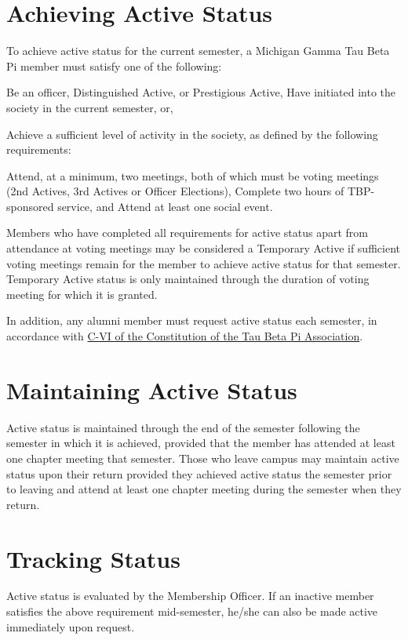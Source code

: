 \section{Achieving Active Status} To achieve active status for the current semester, a Michigan Gamma Tau Beta Pi member must satisfy one of the following:
\begin{enumsubsection} %
\itemnotoc	Be an officer, Distinguished Active, or Prestigious Active,
\itemnotoc	Have initiated into the society in the current semester, or,


\itemnotoc	Achieve a sufficient level of activity in the society, as defined by the following requirements:
\begin{enumsubsubsection}
\itemnotoc	Attend, at a minimum, two meetings, both of which must be  voting meetings (2nd Actives, 3rd Actives or Officer Elections),
\itemnotoc	Complete two hours of TBP-sponsored service, and
\itemnotoc	Attend at least one social event.
\end{enumsubsubsection} 
\end{enumsubsection} 
Members who have completed all requirements for active status apart from attendance at voting meetings may be considered a Temporary Active if sufficient voting meetings remain for the member to achieve active status for that semester. Temporary Active status is only maintained through the duration of voting meeting for which it is granted. 

In addition, any alumni member must request active status each semester, in accordance with \href{http://www.tbp.org/off/ConstBylaw.pdf}{C-VI of the Constitution of the Tau Beta Pi Association}.

\section{Maintaining Active Status} Active status is maintained through the end of the semester following the semester in which it is achieved, provided that the member has attended at least one chapter meeting that semester. Those who leave campus may maintain active status upon their return provided they achieved active status the semester prior to leaving and attend at least one chapter meeting during the semester when they return.

\section{Tracking Status}  Active status is evaluated by the Membership Officer.  If an inactive member satisfies the above requirement mid-semester, he/she can also be made active immediately upon request.  

